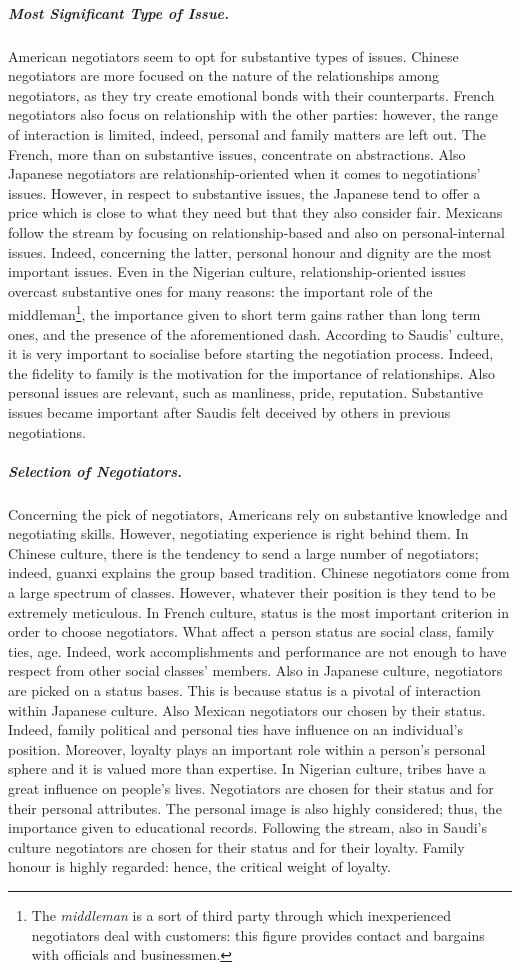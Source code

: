 \documentclass[../main.tex]{subfiles}
\begin{document}
\subparagraph{Most Significant Type of Issue.} American negotiators seem to opt for substantive types of issues. Chinese negotiators are more focused on the nature of the relationships among negotiators, as they try create emotional bonds with their counterparts. French negotiators also focus on relationship with the other parties: however, the range of interaction is limited, indeed, personal and family matters are left out. The French, more than on substantive issues, concentrate on abstractions. Also Japanese negotiators are relationship-oriented when it comes to negotiations' issues. However, in respect to substantive issues, the Japanese tend to offer a price which is close to what they need but that they also consider fair. Mexicans follow the stream by focusing on relationship-based and also on personal-internal issues. Indeed, concerning the latter, personal honour and dignity are the most important issues. Even in the Nigerian culture, relationship-oriented issues overcast substantive ones for many reasons: the important role of the middleman\footnote{The \textit{middleman} is a sort of third party through which inexperienced negotiators deal with customers: this figure provides contact and bargains with officials and businessmen.}, the importance given to short term gains rather than long term ones, and the presence of the aforementioned dash. According to Saudis' culture, it is very important to socialise before starting the negotiation process. Indeed, the fidelity to family is the motivation for the importance of relationships. Also personal issues are relevant, such as manliness, pride, reputation. Substantive issues became important after Saudis felt deceived by others in previous negotiations.

\subparagraph{Selection of Negotiators.} Concerning the pick of negotiators,  Americans rely on substantive knowledge and negotiating  skills. However, negotiating experience is right behind them. In Chinese culture, there is the tendency to send a large number of negotiators; indeed, guanxi explains the group based tradition. Chinese negotiators come from a large spectrum of classes. However, whatever their position is they tend to be extremely meticulous.  In French culture,  status is the most important criterion in order to choose negotiators.  What affect a person status are social class, family ties, age. Indeed, work accomplishments and performance are not enough to have respect from other social classes' members. Also in Japanese culture,  negotiators are picked on a status bases. This is because status is a pivotal of interaction within Japanese culture. Also Mexican negotiators our chosen by their status. Indeed, family political and personal ties have influence on an individual's position. Moreover, loyalty plays an important role within a person's personal sphere and it is valued more than expertise. In Nigerian culture, tribes have a great influence on people's lives. Negotiators are chosen for their status and for their personal attributes. The personal image is also highly considered; thus, the importance given to educational records. Following the stream, also in Saudi's culture negotiators are chosen for their status and for their loyalty. Family honour is highly regarded: hence, the critical weight of loyalty.
\end{document}
